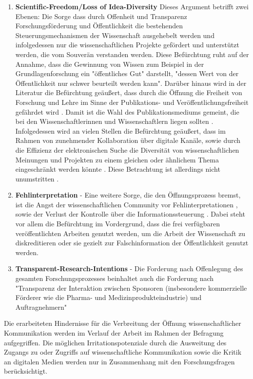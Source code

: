 \begin{enumerate}
\item \textbf{Scientific-Freedom/Loss of Idea-Diversity}
Dieses Argument betrifft zwei Ebenen: Die Sorge dass durch Offenheit und Transparenz Forschungsförderung und Öffentlichkeit die bestehenden Steuerungsmechanismen der Wissenschaft ausgehebelt werden und infolgedessen nur die wissenschaftlichen Projekte gefördert und unterstützt werden, die vom Souverän verstanden werden. Diese Befürchtung ruht auf der Annahme, dass die Gewinnung von Wissen zum Beispiel in der Grundlagenforschung ein "öffentliches Gut" darstellt, "dessen Wert von der Öffentlichkeit nur schwer beurteilt werden kann"\cite{osterloh2008anreize}. Darüber hinaus wird in der Literatur die Befürchtung geäußert, dass durch die Öffnung die Freiheit von Forschung und Lehre im Sinne der Publikations- und Veröffentlichungsfreiheit gefährdet wird \cite{Jochum_2009}. Damit ist die Wahl des Publikationsmediums gemeint, die bei den Wissenschaftlerinnen und Wissenschaftlern liegen sollten \cite{bbaw_publizieren_2015} . Infolgedessen wird an vielen Stellen die Befürchtung geäußert, dass im Rahmen von zunehmender Kollaboration über digitale Kanäle, sowie durch die Effizienz der elektronischen Suche die Diversität von wissenschaftlichen Meinungen und Projekten zu einem gleichen oder ähnlichem Thema eingeschränkt werden könnte \cite{Evans_2008}. Diese Betrachtung ist allerdings nicht unumstritten \cite{lariviere2009decline}.
\item \textbf{Fehlinterpretation} - Eine weitere Sorge, die den Öffnungsprozess bremst, ist die Angst der wissenschaftlichen Community vor Fehlinterpretationen \cite{grand_2012_open}, sowie der Verlust der Kontrolle über die Informationssteuerung \cite{gibbons_1994}. Dabei steht vor allem die Befürchtung im Vordergrund, dass die frei verfügbaren veröffentlichten Arbeiten genutzt werden, um die Arbeit der Wissenschaft zu diskreditieren oder sie gezielt zur Falschinformation der Öffentlichkeit genutzt werden.
\item \textbf{Transparent-Research-Intentions} - Die Forderung nach Offenlegung des gesamten Forschungsprozesses beinhaltet auch die Forderung nach "Transparenz der Interaktion zwischen Sponsoren (insbesondere kommerzielle Förderer wie die Pharma- und Medizinprodukteindustrie) und Auftragnehmern" \cite{Stengel_2013}
\end{enumerate}

Die erarbeiteten Hindernisse für die Verbreitung der Öffnung wissenschaftlicher Kommunikation werden im Verlauf der Arbeit im Rahmen der Befragung aufgegriffen. Die möglichen Irritationspotenziale durch die Ausweitung des Zugangs zu oder Zugriffs auf wissenschaftliche Kommunikation sowie die Kritik an digitalen Medien werden nur in Zusammenhang mit den Forschungsfragen berücksichtigt.

